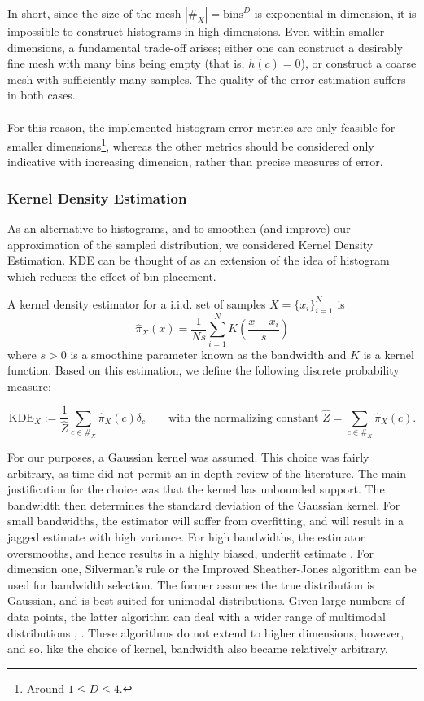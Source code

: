 In short, since the size of the mesh $|\#_X| = \text{bins}^D$ is exponential in dimension, it is impossible to construct histograms in high dimensions. Even within smaller dimensions, a fundamental trade-off arises; either one can construct a desirably fine mesh with many bins being empty (that is, $h(c) = 0$), or construct a coarse mesh with sufficiently many samples. The quality of the error estimation suffers in both cases. \\\\
For this reason, the implemented  histogram  error metrics are only feasible for smaller dimensions\footnote{Around $1 \leq D \leq 4$.}, whereas the other metrics should be considered only indicative with increasing dimension, rather than precise measures of error.

\subsubsection{Kernel Density Estimation}
As an alternative to histograms, and to smoothen (and improve) our approximation of the sampled distribution, we considered Kernel Density Estimation. KDE can be thought of as an extension of the idea of histogram which reduces the effect of bin placement.

\begin{defn}[KDE]
A kernel density estimator for a i.i.d. set of samples $X = \{x_i\}_{i=1}^N$ is
\[\hat{\pi}_{X} (x) = \frac 1 {Ns} \sum_{i=1}^N K\left( \frac{x - x_i}{s} \right)\]
where $s > 0$ is a smoothing parameter known as the bandwidth and $K$ is a kernel function. Based on this estimation, we define the following discrete probability measure:

\[ \text{KDE}_X := \frac 1 {\hat Z} \sum_{c \in \#_X} \hat{\pi}_X(c) \delta_c \qquad \text{with the normalizing constant } \hat Z = \sum_{c \in \#_X} \hat{\pi}_X(c).\]
\end{defn}

For our purposes, a Gaussian kernel was assumed.  This choice was fairly arbitrary, as time did not permit an in-depth review of the literature.  The main justification for the choice was that the kernel has unbounded support.  The bandwidth then determines the standard deviation of the Gaussian kernel.  For small bandwidths, the estimator will suffer from overfitting, and will result in a jagged estimate with high variance.  For high bandwidths, the estimator oversmooths, and hence results in a highly biased, underfit estimate \cite{kroese2013handbook}.  For dimension one, Silverman's rule or the Improved Sheather-Jones algorithm can be used for bandwidth selection.  The former assumes the true distribution is Gaussian, and is best suited for unimodal distributions.  Given large numbers of data points, the latter algorithm can deal with a wider range of multimodal distributions \cite{botev2010kernel}, \cite{wand1994kernel}.  These algorithms do not extend to higher dimensions, however, and so, like the choice of kernel, bandwidth also became relatively arbitrary.

